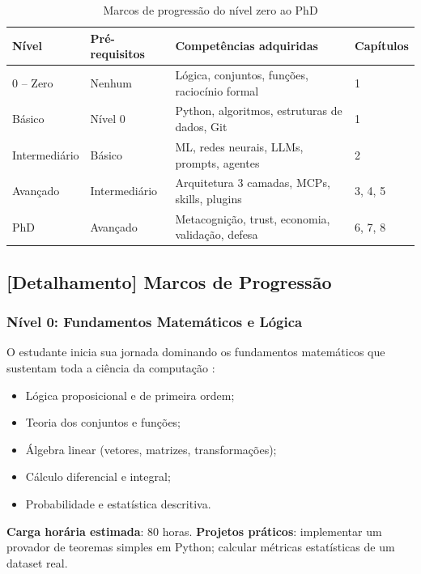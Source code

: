 \begin{table}[htb]
\centering
\caption{Marcos de progressão do nível zero ao PhD}
\label{tab:marcos-progressao}
\begin{tabular}{p{2cm}p{3cm}p{4cm}p{3cm}}
\toprule
\textbf{Nível} & \textbf{Pré-requisitos} & \textbf{Competências adquiridas} & \textbf{Capítulos} \\
\midrule
0 -- Zero & Nenhum & Lógica, conjuntos, funções, raciocínio formal & 1 \\
Básico & Nível 0 & Python, algoritmos, estruturas de dados, Git & 1 \\
Intermediário & Básico & ML, redes neurais, LLMs, prompts, agentes & 2 \\
Avançado & Intermediário & Arquitetura 3 camadas, MCPs, skills, plugins & 3, 4, 5 \\
PhD & Avançado & Metacognição, trust, economia, validação, defesa & 6, 7, 8 \\
\bottomrule
\end{tabular}
\end{table}

\subsection{[Detalhamento] Marcos de Progressão}

\subsubsection{Nível 0: Fundamentos Matemáticos e Lógica}

O estudante inicia sua jornada dominando os fundamentos matemáticos que
sustentam toda a ciência da computação \cite{russell2020inteligencia}:

\begin{itemize}
\item Lógica proposicional e de primeira ordem;
\item Teoria dos conjuntos e funções;
\item Álgebra linear (vetores, matrizes, transformações);
\item Cálculo diferencial e integral;
\item Probabilidade e estatística descritiva.
\end{itemize}

\textbf{Carga horária estimada}: 80 horas.
\textbf{Projetos práticos}: implementar um provador de teoremas simples em
Python; calcular métricas estatísticas de um dataset real.

